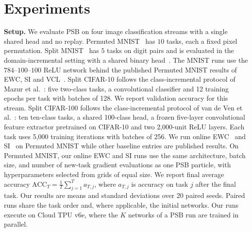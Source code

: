 \documentclass{article}
\begin{document}
\section{Experiments}
\label{sec:experiments}




\textbf{Setup.} We evaluate PSB on four image classification streams with a
single shared head and no replay. Permuted
MNIST~\cite{goodfellow2013empirical} has $10$ tasks, each a fixed pixel
permutation. Split MNIST~\cite{zenke2017si} has $5$ tasks on digit pairs and is
evaluated in the domain-incremental setting with a shared binary
head~\cite{vandeven2022types}. The MNIST runs use the
$784$--$100$--$100$ ReLU network behind the published Permuted MNIST
results of EWC, SI and VCL~\cite{nguyen2018vcl}.
Split CIFAR-10 follows the class-incremental protocol of Mazur et al.~\cite{mazur2021target}: five two-class tasks, a convolutional classifier and 12 training epochs per task with batches of 128. We report
validation accuracy for this
stream. Split CIFAR-100 follows the class-incremental protocol of van de Ven et al.~\cite{vandeven2022types}: ten ten-class tasks, a
shared 100-class head, a frozen five-layer convolutional feature
extractor pretrained on CIFAR-10 and two 2,000-unit ReLU layers.
Each task uses 5,000 training iterations with batches of 256.
We run online EWC~\cite{schwarz2018progress} and
  SI~\cite{zenke2017si} on Permuted MNIST while other baseline entries
  are published results. On Permuted MNIST, our online EWC and SI runs
  use the same architecture, batch size, and number of new-task gradient
  evaluations as one PSB particle, with hyperparameters selected from grids of equal
  size. We report final average accuracy
  $\mathrm{ACC}_T=\frac1T\sum_{j=1}^{T}a_{T,j}$, where $a_{T,j}$ is accuracy on
  task $j$ after the final task. Our results are means and standard
  deviations over 20 paired seeds. Paired runs share the task order and,
  where applicable, the initial networks. Our runs execute on Cloud
  TPU v6e, where the $K$ networks of a PSB run are trained in parallel. 
\end{document}
